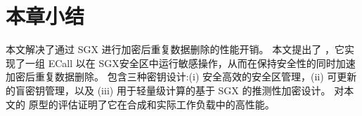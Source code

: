 \section{本章小结}
\label{sec:sgxdedup-sgxdedup-conclusion}

本文解决了通过 SGX 进行加密后重复数据删除的性能开销。 本文提出了 \sysnameS，它实现了一组 ECall 以在 SGX安全区中运行敏感操作，从而在保持安全性的同时加速加密后重复数据删除。 \sysnameS 包含三种密钥设计:(i) 安全高效的安全区管理，(ii) 可更新的盲密钥管理，以及 (iii) 用于轻量级计算的基于 SGX 的推测性加密设计。 对本文的 \sysnameS 原型的评估证明了它在合成和实际工作负载中的高性能。